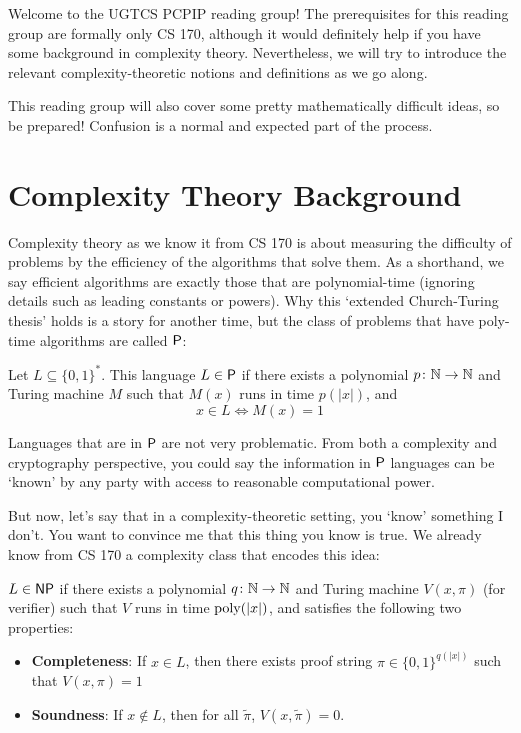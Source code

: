 \documentclass{article}
\begin{document}

Welcome to the UGTCS PCPIP reading group!
The prerequisites for this reading group are formally only CS 170, although it would definitely
help if you have some background in complexity theory.
Nevertheless, we will try to introduce the relevant complexity-theoretic notions and definitions
as we go along. 

This reading group will also cover some pretty mathematically difficult ideas, so be prepared!
Confusion is a normal and expected part of the process.

\section{Complexity Theory Background}
Complexity theory as we know it from CS 170 is about measuring the difficulty of problems by
the efficiency of the algorithms that solve them.
As a shorthand, we say efficient algorithms are exactly those that are 
polynomial-time (ignoring details such as leading constants or powers).
Why this `extended Church-Turing thesis' holds is a story for another time,
but the class of problems that have poly-time algorithms are called $\mathsf{P}$:

\begin{definition}
    Let $L \subseteq \{0, 1\}^*$. This language $L \in \mathsf{P}$ if there exists a
    polynomial $p\colon \mathbb{N} \to \mathbb{N}$ and Turing machine $M$ such that $M(x)$ runs in time $p(|x|)$, and 
    $$ x \in L \iff M(x) = 1$$
\end{definition}

Languages that are in $\mathsf{P}$ are not very problematic.
From both a complexity and cryptography perspective, you could say the information in
$\mathsf{P}$ languages can be `known' by any party with access to reasonable computational power.

But now, let's say that in a complexity-theoretic setting, you `know' something I don't.
You want to convince me that this thing you know is true.
We already know from CS 170 a complexity class that encodes this idea:

\begin{definition}
    $L \in \mathsf{NP}$ if there exists a polynomial $q \colon \mathbb{N} \to \mathbb{N}$ and Turing machine $V(x, \pi)$ (for verifier) such that
    $V$ runs in time $\operatorname*{\textup{poly}}(|x|)$, and satisfies the following two properties:
    \begin{itemize}
        \item \textbf{Completeness}: If $x \in L$, then there exists proof string $\pi \in \{0, 1\}^{q(|x|)}$ such that $V(x, \pi) = 1$
        \item \textbf{Soundness}: If $x \notin L$, then for all $\tilde{\pi}$, $V(x, \tilde{\pi}) = 0$.
    \end{itemize}
\end{definition}
\end{document}

